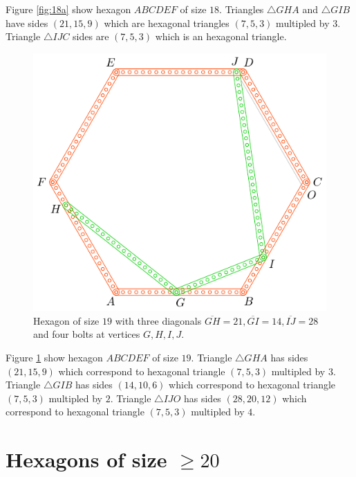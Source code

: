 \documentclass[11pt]{article}
\begin{document}
Figure \ref{fig:18a} show hexagon $ABCDEF$ of size $18$. Triangles $\triangle{GHA}$ and $\triangle{GIB}$ have sides $(21,15,9)$ which are hexagonal triangles $(7,5,3)$ multipled by $3$. Triangle $\triangle{IJC}$ sides are $(7,5,3)$ which is an hexagonal triangle.


\begin{figure}[H]
\centering
\includegraphics[scale=1]{19/hexa-19a}
\caption{Hexagon of size $19$ with three diagonals $\overline{GH} = 21, \overline{GI} = 14, \overline{IJ} = 28$ and four bolts at vertices $G,H,I,J$.}
\label{fig:19a}
\end{figure}

Figure \ref{fig:19a} show hexagon $ABCDEF$ of size $19$. Triangle $\triangle{GHA}$ has sides $(21,15,9)$ which correspond to hexagonal triangle $(7,5,3)$ multipled by $3$. Triangle $\triangle{GIB}$ has sides $(14,10,6)$ which correspond to hexagonal triangle $(7,5,3)$ multipled by $2$. Triangle $\triangle{IJO}$ has sides $(28,20,12)$ which correspond to hexagonal triangle $(7,5,3)$ multipled by $4$.

\section{Hexagons of size $\ge 20$}
\end{document}

